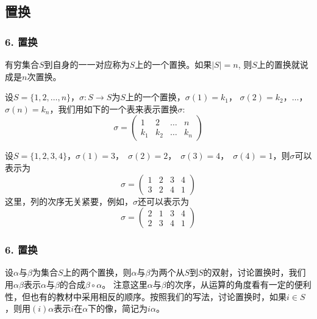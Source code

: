 \documentclass{beamer}
\begin{document}
\begin{CJK*}{UTF8}{gbsn}
\section{置换}
\begin{frame}
  \frametitle{6. 置换}
  \begin{Def}
    有穷集合$S$到自身的一一对应称为$S$上的一个\alert{置换}。如果$|S| = n$, 则$S$上的置换就说成是\alert{$n$次置换}。
  \end{Def}
\justifying\let\raggedright\justifying
设$S=\{1,2,\ldots,n\}$，$\sigma:S\to S$为$S$上的一个置换，$\sigma(1) = k_1$， $\sigma(2) = k_2$，$\ldots$，$\sigma(n) = k_n$，我们用如下的一个表来表示置换$\sigma$:
\[\sigma=\begin{pmatrix}1&2&\ldots&n\\k_1&k_2&\ldots&k_n\end{pmatrix}\]
\small{\begin{Ex}
  设$S=\{1,2,3,4\}$，$\sigma(1) = 3$，　$\sigma(2) = 2$，　$\sigma(3) = 4$，　$\sigma(4) = 1$，则$\sigma$可以表示为
  \[\sigma=\begin{pmatrix}1&2&3&4\\3&2&4&1\end{pmatrix}\]
  这里，列的次序无关紧要，例如，$\sigma$还可以表示为
  \[\sigma=\begin{pmatrix}2&1&3&4\\2&3&4&1\end{pmatrix}\]
\end{Ex}}
\end{frame}
\begin{frame}
  \frametitle{6. 置换} 
  \begin{Def}
    设$\alpha$与$\beta$为集合$S$上的两个置换，则$\alpha$与$\beta$为两个从$S$到$S$的双射，讨论置换时，我们用$\alpha\beta$表示$\alpha$与$\beta$的合成$\beta \circ \alpha$。
    注意这里$\alpha$与$\beta$的次序，从运算的角度看有一定的便利性，但也有的教材中采用相反的顺序。按照我们的写法，讨论置换时，如果$i \in S$，则用$(i)\alpha$表示$i$在$\alpha$下的像，简记为$i\alpha$。
  \end{Def}
 \end{frame}


\end{CJK*}
\end{document}
